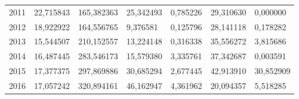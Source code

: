 \begin{table}
\begin{tabular}{p{1cm}p{2cm}p{2cm}p{2cm}p{2cm}p{2cm}p{2cm}}
 2011 &                              22,715843 & 165,382363 & 25,342493 &                   0,785226 &                           29,310630 &    0,000000 \\
 2012 &                              18,922922 & 164,556765 &  9,376581 &                   0,125796 &                           28,141118 &    0,178282 \\
 2013 &                              15,544507 & 210,152557 & 13,224148 &                   0,316338 &                           35,556272 &    3,815686 \\
 2014 &                              16,487445 & 283,546173 & 15,579380 &                   3,335761 &                           37,342687 &    0,003591 \\
 2015 &                              17,377375 & 297,869886 & 30,685294 &                   2,677445 &                           42,913910 &   30,852909 \\
 2016 &                              17,057242 & 320,894161 & 46,162947 &                   4,361962 &                           20,094357 &    5,518285 \\
\bottomrule
\end{tabular}
\end{table}
